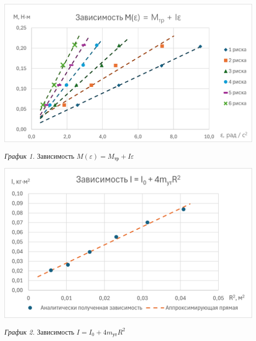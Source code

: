 \hypertarget{diagram1}{}

\begin{center}
    \includegraphics[width=15cm]{images/diagram1}

    \smallvspace

    \textit{График 1.} Зависимость $M(\varepsilon) = M_\text{тр} + I\varepsilon$
\end{center}

\begin{center}
    \includegraphics[width=15cm]{images/diagram2}

    \smallvspace

    \textit{График 2.} Зависимость $I = I_0 + 4m_\text{ут} R^2$
\end{center}
